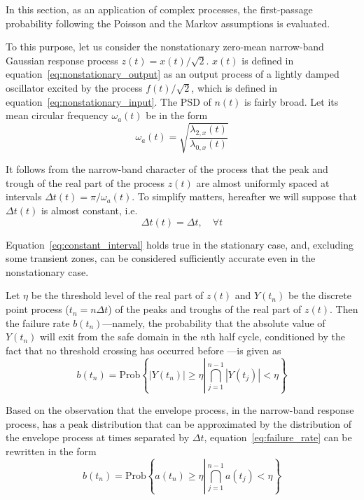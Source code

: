\documentclass[11pt]{article}
\begin{document}
In this section, as an application of complex processes, the first-passage probability following the Poisson and the Markov assumptions is evaluated.

To this purpose, let us consider the nonstationary zero-mean narrow-band Gaussian response process $z(t) = x(t)/\sqrt{2}$. $x(t)$ is defined in equation~\eqref{eq:nonstationary_output} as an output process of a lightly damped oscillator excited by the process $f(t)/\sqrt{2}$, which is defined in equation~\eqref{eq:nonstationary_input}. The PSD of $n(t)$ is fairly broad. Let its mean circular frequency $\omega_a(t)$ be in the form
\begin{equation}
\omega_a(t) = \sqrt{\frac{\lambda_{2,x}(t)}{\lambda_{0,x}(t)}}
\label{eq:mean_frequency}
\end{equation}

It follows from the narrow-band character of the process that the peak and trough of the real part of the process $z(t)$ are almost uniformly spaced at intervals $\Delta t(t) = \pi/\omega_a(t)$. To simplify matters, hereafter we will suppose that $\Delta t(t)$ is almost constant, i.e.
\begin{equation}
\Delta t(t) = \Delta t, \quad \forall t
\label{eq:constant_interval}
\end{equation}

Equation~\eqref{eq:constant_interval} holds true in the stationary case, and, excluding some transient zones, can be considered sufficiently accurate even in the nonstationary case.

Let $\eta$ be the threshold level of the real part of $z(t)$ and $Y(t_n)$ be the discrete point process ($t_n = n\Delta t$) of the peaks and troughs of the real part of $z(t)$. Then the failure rate $b(t_n)$---namely, the probability that the absolute value of $Y(t_n)$ will exit from the safe domain in the $n$th half cycle, conditioned by the fact that no threshold crossing has occurred before \cite{yang1971}---is given as
\begin{equation}
b(t_n) = \text{Prob}\left\{|Y(t_n)| \geq \eta \left| \bigcap_{j=1}^{n-1} |Y(t_j)| < \eta \right.\right\}
\label{eq:failure_rate}
\end{equation}

Based on the observation that the envelope process, in the narrow-band response process, has a peak distribution that can be approximated by the distribution of the envelope process at times separated by $\Delta t$, equation~\eqref{eq:failure_rate} can be rewritten in the form
\begin{equation}
b(t_n) = \text{Prob}\left\{a(t_n) \geq \eta \left| \bigcap_{j=1}^{n-1} a(t_j) < \eta \right.\right\}
\label{eq:failure_rate_envelope}
\end{equation}
\end{document}
